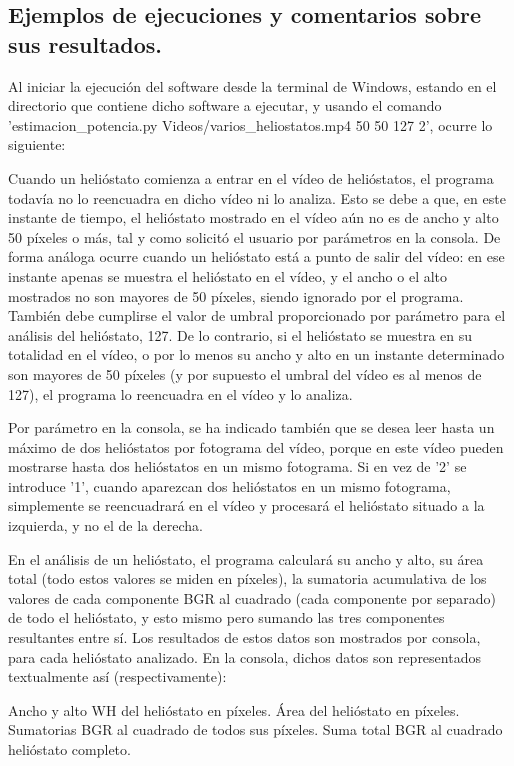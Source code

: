 \subsection{Ejemplos de ejecuciones y comentarios sobre sus resultados.}

Al iniciar la ejecución del software desde la terminal de Windows, estando en el directorio que contiene dicho software a ejecutar, y usando el comando 'estimacion\_potencia.py Videos/varios\_heliostatos.mp4 50 50 127 2', ocurre lo siguiente:

Cuando un helióstato comienza a entrar en el vídeo de helióstatos, el programa todavía no lo reencuadra en dicho vídeo ni lo analiza. Esto se debe a que, en este instante de tiempo, el helióstato mostrado en el vídeo aún no es de ancho y alto 50 píxeles o más, tal y como solicitó el usuario por parámetros en la consola. De forma análoga ocurre cuando un helióstato está a punto de salir del vídeo: en ese instante apenas se muestra el helióstato en el vídeo, y el ancho o el alto mostrados no son mayores de 50 píxeles, siendo ignorado por el programa. También debe cumplirse el valor de umbral proporcionado por parámetro para el análisis del helióstato, 127. De lo contrario, si el helióstato se muestra en su totalidad en el vídeo, o por lo menos su ancho y alto en un instante determinado son mayores de 50 píxeles (y por supuesto el umbral del vídeo es al menos de 127), el programa lo reencuadra en el vídeo y lo analiza.

Por parámetro en la consola, se ha indicado también que se desea leer hasta un máximo de dos helióstatos por fotograma del vídeo, porque en este vídeo pueden mostrarse hasta dos helióstatos en un mismo fotograma. Si en vez de '2' se introduce '1', cuando aparezcan dos helióstatos en un mismo fotograma, simplemente se reencuadrará en el vídeo y procesará el helióstato situado a la izquierda, y no el de la derecha.

En el análisis de un helióstato, el programa calculará su ancho y alto, su área total (todo estos valores se miden en píxeles), la sumatoria acumulativa de los valores de cada componente BGR al cuadrado (cada componente por separado) de todo el helióstato, y esto mismo pero sumando las tres componentes resultantes entre sí. Los resultados de estos datos son mostrados por consola, para cada helióstato analizado. En la consola, dichos datos son representados textualmente así (respectivamente):

Ancho y alto WH del helióstato en píxeles.
Área del helióstato en píxeles.
Sumatorias BGR al cuadrado de todos sus píxeles.
Suma total BGR al cuadrado helióstato completo.

